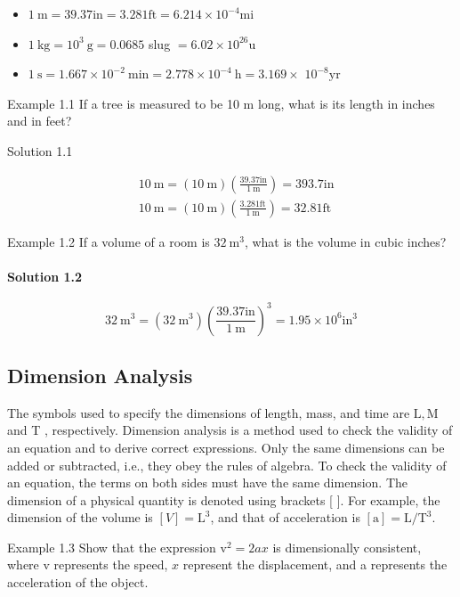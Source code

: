 \documentclass[10pt]{article}
\numberwithin{equation}{section}
\begin{document}
\begin{itemize}
  \item $1 \mathrm{~m}=39.37 \mathrm{in}=3.281 \mathrm{ft}=6.214 \times 10^{-4} \mathrm{mi}$
  \item $1 \mathrm{~kg}=10^{3} \mathrm{~g}=0.0685$ slug $=6.02 \times 10^{26} \mathrm{u}$
  \item $1 \mathrm{~s}=1.667 \times 10^{-2} \mathrm{~min}=2.778 \times 10^{-4} \mathrm{~h}=3.169 \times$ $10^{-8} \mathrm{yr}$
\end{itemize}

Example 1.1 If a tree is measured to be 10 m long, what is its length in inches and in feet?

Solution 1.1

$$
\begin{aligned}
& 10 \mathrm{~m}=(10 \mathrm{~m})\left(\frac{39.37 \mathrm{in}}{1 \mathrm{~m}}\right)=393.7 \mathrm{in} \\
& 10 \mathrm{~m}=(10 \mathrm{~m})\left(\frac{3.281 \mathrm{ft}}{1 \mathrm{~m}}\right)=32.81 \mathrm{ft}
\end{aligned}
$$

Example 1.2 If a volume of a room is $32 \mathrm{~m}^{3}$, what is the volume in cubic inches?

\paragraph*{Solution 1.2}
$$
32 \mathrm{~m}^{3}=\left(32 \mathrm{~m}^{3}\right)\left(\frac{39.37 \mathrm{in}}{1 \mathrm{~m}}\right)^{3}=1.95 \times 10^{6} \mathrm{in}^{3}
$$

\subsection{Dimension Analysis}\label{sec:1-4}
The symbols used to specify the dimensions of length, mass, and time are $\mathrm{L}, \mathrm{M}$ and T , respectively. Dimension analysis is a method used to check the validity of an equation and to derive correct expressions. Only the same dimensions can be added or subtracted, i.e., they obey the rules of algebra. To check the validity of an equation, the terms on both sides must have the same dimension. The dimension of a physical quantity is denoted using brackets [ ]. For example, the dimension of the volume is $[V]=\mathrm{L}^{3}$, and that of acceleration is $[\mathrm{a}]=\mathrm{L} / \mathrm{T}^{3}$.

Example 1.3 Show that the expression $\mathrm{v}^{2}=2 a x$ is dimensionally consistent, where v represents the speed, $x$ represent the displacement, and a represents the acceleration of the object.
\end{document}

